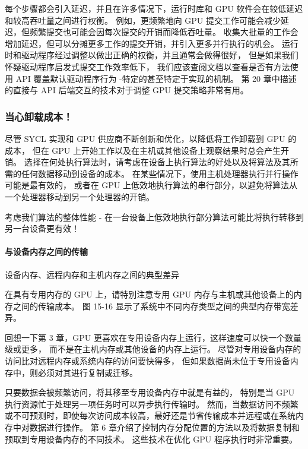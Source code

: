 每个步骤都会引入延迟，并且在许多情况下，运行时库和 GPU 软件会在较低延迟和较高吞吐量之间进行权衡。 
例如，更频繁地向 GPU 提交工作可能会减少延迟，但频繁提交也可能会因每次提交的开销而降低吞吐量。 
收集大批量的工作会增加延迟，但可以分摊更多工作的提交开销，并引入更多并行执行的机会。 
运行时和驱动程序经过调整以做出正确的权衡，并且通常会做得很好，
但是如果我们怀疑驱动程序启发式提交工作效率低下，
我们应该查阅文档以查看是否有方法使用 API 覆盖默认驱动程序行为 -特定的甚至特定于实现的机制。 
第 20 章中描述的直接与 API 后端交互的技术对于调整 GPU 提交策略非常有用。

\subsubsection{当心卸载成本！}
尽管 SYCL 实现和 GPU 供应商不断创新和优化，以降低将工作卸载到 GPU 的成本，
但在 GPU 上开始工作以及在主机或其他设备上观察结果时总会产生开销。 
选择在何处执行算法时，请考虑在设备上执行算法的好处以及将算法及其所需的任何数据移动到设备的成本。 
在某些情况下，使用主机处理器执行并行操作可能是最有效的，
或者在 GPU 上低效地执行算法的串行部分，以避免将算法从一个处理器移动到另一个处理器的开销。

\begin{remark}
	考虑我们算法的整体性能 - 在一台设备上低效地执行部分算法可能比将执行转移到另一台设备更有效！
\end{remark}

\paragraph{与设备内存之间的传输}

{\color{red} 设备内存、远程内存和主机内存之间的典型差异}

在具有专用内存的 GPU 上，请特别注意专用 GPU 内存与主机或其他设备上的内存之间的传输成本。 
图 15-16 显示了系统中不同内存类型之间的典型内存带宽差异。

回想一下第 3 章，GPU 更喜欢在专用设备内存上运行，这样速度可以快一个数量级或更多，
而不是在主机内存或其他设备的内存上运行。 
尽管对专用设备内存的访问比对远程内存或系统内存的访问要快得多，
但如果数据尚未位于专用设备内存中，则必须对其进行复制或迁移。

只要数据会被频繁访问，将其移至专用设备内存中就是有益的，
特别是当 GPU 执行资源忙于处理另一项任务时可以异步执行传输时。 
然而，当数据访问不频繁或不可预测时，即使每次访问成本较高，最好还是节省传输成本并远程或在系统内存中对数据进行操作。 
第 6 章介绍了控制内存分配位置的方法以及将数据复制和预取到专用设备内存的不同技术。 
这些技术在优化 GPU 程序执行时非常重要。

